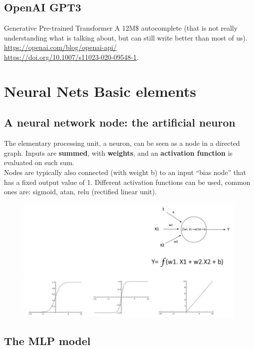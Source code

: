 \subsection{OpenAI GPT3}

Generative Pre-trained Transformer A 12M\$ autocomplete (that is not really understanding what is talking about, but can still write better than most of us). \url{https://openai.com/blog/openai-api/}\\
\url{https://doi.org/10.1007/s11023-020-09548-1}.
\section{Neural Nets Basic elements}
\subsection{A neural network node: the artificial neuron}
The elementary processing unit, a neuron, can be seen as a node in a directed graph. Inputs are \textbf{summed}, with \textbf{weights}, and an \textbf{activation function} is evaluated on such sum.\\
Nodes are typically also connected (with weight b) to an input “bias node” that has a fixed output value of 1. Different activation functions can be used, common ones are: sigmoid, atan, relu (rectified linear unit).

\begin{figure}[ht]
		\centering
		\includegraphics[width=0.7\linewidth]{figure_ml/neuron.png}
\end{figure}
\FloatBarrier


\subsection{The MLP model}

